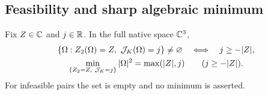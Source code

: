 \subsection{Feasibility and sharp algebraic minimum}
\begin{proposition}\label{prop:minimum}%
Fix $Z\in\mathbb C$ and $j\in\mathbb R$. In the full native space $\mathbb C^3$,
\begin{equation}\label{eq:minimum}%
\begin{gathered}
\{\Omega:Z_2(\Omega)=Z,\ \Jk(\Omega)=j\}\ne\varnothing
\quad\Longleftrightarrow\quad j\ge-|Z|,\\
\min_{\{Z_2=Z,\ \Jk=j\}}|\Omega|^2=\max(|Z|,j)
\qquad(j\ge-|Z|).
\end{gathered}
\end{equation}
For infeasible pairs the set is empty and no minimum is asserted.
\end{proposition}

